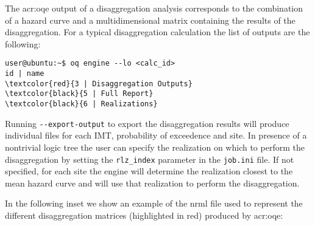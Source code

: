 The \glsdesc{acr:oqe} output of a disaggregation analysis corresponds to the
combination of a hazard curve and a multidimensional matrix containing the
results of the disaggregation. For a typical disaggregation calculation the
list of outputs are the following:

\begin{Verbatim}[frame=single, commandchars=\\\{\}, fontsize=\small]
user@ubuntu:~$ oq engine --lo <calc_id>
id | name
\textcolor{red}{3 | Disaggregation Outputs}
\textcolor{black}{5 | Full Report}
\textcolor{black}{6 | Realizations}
\end{Verbatim}
%

Running \texttt{-{}-export-output} to export the disaggregation results will produce individual files for each IMT, probability of exceedence and site.
In presence of a nontrivial logic tree the user can specify the realization
on which to perform the disaggregation by setting the \texttt{rlz\_index}
parameter in the \texttt{job.ini} file. If not specified, for each site
the engine will determine the realization closest to the mean hazard curve
and will use that realization to perform the disaggregation.

In the following inset we show an example of the nrml file used to represent the different disaggregation matrices (highlighted in red) produced by
\gls{acr:oqe}:



